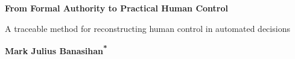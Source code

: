 \documentclass[11pt]{article}
\begin{document}
\thispagestyle{plain}

\begin{center}
{\LARGE\bfseries\color{TAENavy} From Formal Authority to Practical Human Control\par}
\vspace{0.45em}
{\large A traceable method for reconstructing human control in automated decisions\par}
\vspace{0.45em}
{\large\bfseries Mark Julius Banasihan\textsuperscript{*}\par}

\vspace{0.35em}
\end{center}
\end{document}
